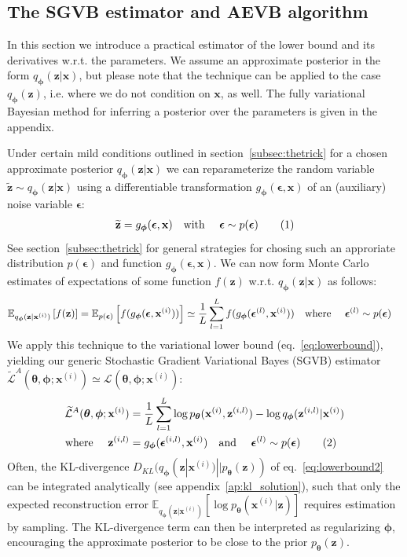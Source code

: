 \documentclass{article} %
\theoremstyle{definition}
\newcommand{\bb}[1]{\mathbf{#1}}
\newcommand{\bx}{\bb{x}}
\newcommand{\bxi}{\bx^{(i)}}
\newcommand{\bz}{\bb{z}}
\newcommand{\bzil}{\bz^{(i,l)}}
\newcommand{\bT}{\boldsymbol{\theta}}
\newcommand{\bphi}{\boldsymbol{\phi}}
\newcommand{\beps}{\boldsymbol{\epsilon}}
\newcommand{\bepsl}{\beps^{(l)}}
\newcommand{\bepsil}{\beps^{(i,l)}}
\newcommand{\btz}{\widetilde{\bz}}
\newcommand{\pT}{p_{\bT}}
\newcommand{\qPhi}{q_{\bphi}}
\newcommand{\gPhi}{g_{\bphi}}
\newcommand{\Exp}[2]{\mathbb{E}_{#1}\left[#2\right]}
\newcommand{\eqnr}{\addtocounter{equation}{1}\tag{\theequation}}
\theoremstyle{definition}
\newcommand{\LB}[2]{\mathcal{L}^{#1}(\bT,\bphi; #2)}
\newcommand{\LBT}[2]{\widetilde{\mathcal{L}}^{#1}(\bT,\bphi; #2)}
\begin{document}
%

%
%

\subsection{The SGVB estimator and AEVB algorithm}
\label{subsec:our_estimator}

In this section we introduce a practical estimator of the lower bound and its derivatives w.r.t. the parameters. We assume an approximate posterior in the form $\qPhi(\bz|\bx)$, but please note that the technique can be applied to the case $\qPhi(\bz)$, i.e. where we do not condition on $\bx$, as well. The fully variational Bayesian method for inferring a posterior over the parameters is given in the appendix.

Under certain mild conditions outlined in section~\ref{subsec:thetrick} for a chosen approximate posterior $\qPhi(\bz|\bx)$ we can reparameterize the random variable $\btz \sim \qPhi(\bz|\bx)$ using a differentiable transformation $\gPhi(\beps,\bx)$ of an (auxiliary) noise variable $\beps$:
\begin{align*}
\btz = \gPhi(\beps,\bx) \text{\quad with \quad} \beps \sim p(\beps)
\eqnr\end{align*}
See section~\ref{subsec:thetrick} for general strategies for chosing such an approriate distribution $p(\beps)$ and function $\gPhi(\beps,\bx)$. 
We can now form Monte Carlo estimates of expectations of some function $f(\bz)$ w.r.t. $\qPhi(\bz|\bx)$ as follows:
\begin{align}
\Exp{\qPhi(\bz|\bxi)}{f(\bz)}
= \Exp{p(\beps)}{f(\gPhi(\beps,\bxi))}
&\simeq \frac{1}{L} \sum_{l=1}^L {f(\gPhi(\bepsl,\bxi))}
 \text{\quad where \quad} \bepsl \sim p(\beps)
\end{align}
%
%
%
%
%
%
%
%
We apply this technique to the variational lower bound (eq.~\eqref{eq:lowerbound}), yielding our generic Stochastic Gradient Variational Bayes (SGVB) estimator $\LBT{A}{\bxi} \simeq \LB{}{\bxi}$:
\begin{align*}
\LBT{A}{\bxi}
&= \frac{1}{L} \sum_{l=1}^L 
\log \pT(\bxi, \bzil) - \log \qPhi(\bzil|\bxi) \\
\text{where \quad} \bzil &= \gPhi(\bepsil,\bxi)
\text{\quad and \quad} \bepsl \sim p(\beps)
\eqnr\label{eq:fullestimator}
\end{align*}
Often, the KL-divergence $D_{KL}(\qPhi(\bz|\bxi) || \pT(\bz))$ of eq.~\eqref{eq:lowerbound2} can be integrated analytically (see appendix~\ref{ap:kl_solution}), such that only the expected reconstruction error $\Exp{\qPhi(\bz|\bxi)}{\log \pT(\bxi | \bz)}$ requires estimation by sampling. The KL-divergence term can then be interpreted as regularizing $\bphi$, encouraging the approximate posterior to be close to the prior $\pT(\bz)$.
\end{document}
